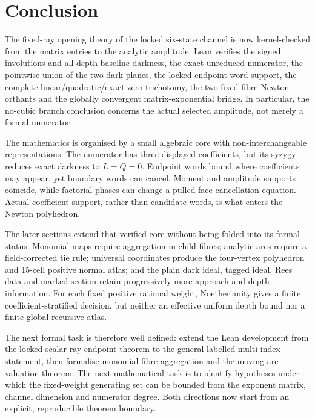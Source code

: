 \section{Conclusion}\label{sec:conclusion}

The fixed-ray opening theory of the locked six-state channel is now
kernel-checked from the matrix entries to the analytic amplitude.  Lean verifies
the signed involutions and all-depth baseline darkness, the exact unreduced
numerator, the pointwise union of the two dark planes, the locked endpoint word
support, the complete linear/quadratic/exact-zero trichotomy, the two
fixed-fibre Newton orthants and the globally convergent matrix-exponential
bridge.  In particular, the no-cubic branch conclusion concerns the actual
selected amplitude, not merely a formal numerator.

The mathematics is organised by a small algebraic core with
non-interchangeable representations.  The numerator has three displayed
coefficients, but its syzygy reduces exact darkness to $L=Q=0$.  Endpoint
words bound where coefficients may appear, yet boundary words can cancel.
Moment and amplitude supports coincide, while factorial phases can change a
pulled-face cancellation equation.  Actual coefficient support, rather than
candidate words, is what enters the Newton polyhedron.

The later sections extend that verified core without being folded into its
formal status.  Monomial maps require aggregation in child fibres; analytic
arcs require a field-corrected tie rule; universal coordinates produce the
four-vertex polyhedron and 15-cell positive normal atlas; and the plain dark
ideal, tagged ideal, Rees data and marked section retain progressively more
approach and depth information.  For each fixed positive rational weight,
Noetherianity gives a finite coefficient-stratified decision, but neither an
effective uniform depth bound nor a finite global recursive atlas.

The next formal task is therefore well defined: extend the Lean development
from the locked scalar-ray endpoint theorem to the general labelled
multi-index statement, then formalise monomial-fibre aggregation and the
moving-arc valuation theorem.  The next mathematical task is to identify
hypotheses under which the fixed-weight generating set can be bounded from the
exponent matrix, channel dimension and numerator degree.  Both directions now
start from an explicit, reproducible theorem boundary.
